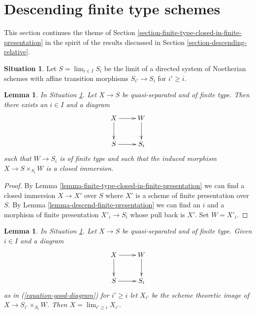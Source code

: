 \documentclass{stacks-project}
\theoremstyle{plain}
\newtheorem{lemma}[subsection]{Lemma}
\theoremstyle{definition}
\newtheorem{situation}[subsection]{Situation}
\theoremstyle{remark}
\numberwithin{equation}{subsection}
\def\lim{\mathop{\mathrm{lim}}\nolimits}
\begin{document}
\section{Descending finite type schemes}
\label{section-finite-type-quasi-separated}

\noindent
This section continues the theme of
Section \ref{section-finite-type-closed-in-finite-presentation}
in the spirit of the results discussed in
Section \ref{section-descending-relative}.

\begin{situation}
\label{situation-limit-noetherian}
Let $S = \lim_{i \in I} S_i$ be the limit of a directed system of
Noetherian schemes with affine transition morphisms $S_{i'} \to S_i$
for $i' \geq i$.
\end{situation}

\begin{lemma}
\label{lemma-good-diagram}
In Situation \ref{situation-limit-noetherian}.
Let $X \to S$ be quasi-separated and of finite type.
Then there exists an $i \in I$ and a diagram
\begin{equation}
\label{equation-good-diagram}
\vcenter{
\xymatrix{
X \ar[r] \ar[d] & W \ar[d] \\
S \ar[r] & S_i
}
}
\end{equation}
such that $W \to S_i$ is of finite type and such that
the induced morphism $X \to S \times_{S_i} W$ is a closed
immersion.
\end{lemma}

\begin{proof}
By Lemma \ref{lemma-finite-type-closed-in-finite-presentation}
we can find a closed immersion $X \to X'$
over $S$ where $X'$ is a scheme of finite presentation over $S$.
By Lemma \ref{lemma-descend-finite-presentation}
we can find an $i$ and a morphism of finite presentation
$X'_i \to S_i$ whose pull back is $X'$. Set $W = X'_i$.
\end{proof}

\begin{lemma}
\label{lemma-limit-from-good-diagram}
In Situation \ref{situation-limit-noetherian}.
Let $X \to S$ be quasi-separated and of finite type.
Given $i \in I$ and a diagram
$$
\vcenter{
\xymatrix{
X \ar[r] \ar[d] & W \ar[d] \\
S \ar[r] & S_i
}
}
$$
as in (\ref{equation-good-diagram}) for $i' \geq i$ let
$X_{i'}$ be the scheme theoretic image of $X \to S_{i'} \times_{S_i} W$.
Then $X = \lim_{i' \geq i} X_{i'}$.
\end{lemma}
\end{document}
